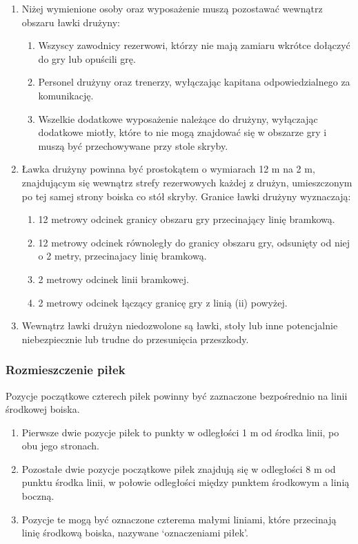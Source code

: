 \documentclass[12pt]{article}
\begin{document}
\begin{enumerate}
	\item Niżej wymienione osoby oraz wyposażenie muszą pozostawać wewnątrz
	      obszaru ławki drużyny:

	      \begin{enumerate}
		      \item Wszyscy zawodnicy rezerwowi, którzy nie mają zamiaru wkrótce
		            dołączyć do gry lub opuścili grę.
		      \item Personel drużyny oraz trenerzy, wyłączając kapitana odpowiedzialnego
		            za komunikację.
		      \item Wszelkie dodatkowe wyposażenie należące do drużyny, wyłączając
		            dodatkowe miotły, które to nie mogą znajdować się w obszarze gry i
		            muszą być przechowywane przy stole skryby.
	      \end{enumerate}

	\item Ławka drużyny powinna być prostokątem o wymiarach 12 m na 2 m,
	      znajdującym się wewnątrz strefy rezerwowych każdej z drużyn,
	      umieszczonym po tej samej strony boiska co stół skryby. Granice ławki
	      drużyny wyznaczają:

	      \begin{enumerate}
		      \item 12 metrowy odcinek granicy obszaru gry przecinający linię bramkową.
		      \item 12 metrowy odcinek równoległy do granicy obszaru gry, odsunięty od
		            niej o 2 metry, przecinajacy linię bramkową.
		      \item 2 metrowy odcinek linii bramkowej.
		      \item 2 metrowy odcinek łączący granicę gry z linią (ii) powyżej.
	      \end{enumerate}

	\item Wewnątrz ławki drużyn niedozwolone są ławki, stoły lub inne
	      potencjalnie niebezpiecznie lub trudne do przesunięcia przeszkody.
\end{enumerate}

\subsubsection{Rozmieszczenie piłek}

Pozycje początkowe czterech piłek powinny być zaznaczone bezpośrednio na
linii środkowej boiska.
\begin{enumerate}
	\item Pierwsze dwie pozycje piłek to punkty w odległości 1 m od środka
	      linii, po obu jego stronach.

	\item Pozostałe dwie pozycje początkowe piłek znajdują się w odległości 8 m
	      od punktu środka linii, w połowie odległości między punktem środkowym a
	      linią boczną.

	\item Pozycje te mogą być oznaczone czterema małymi liniami, które
	      przecinają linię środkową boiska, nazywane `oznaczeniami piłek'.
\end{enumerate}
\end{document}
